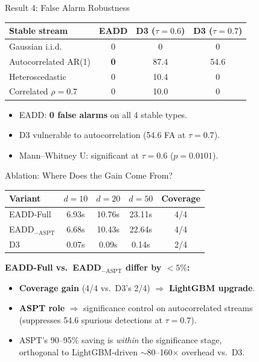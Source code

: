 \documentclass[aspectratio=169,10pt]{beamer}
\begin{document}
\begin{frame}{Result 4: False Alarm Robustness}
\centering\small
\begin{tabular}{lccc}
\toprule
\textbf{Stable stream} & \textbf{EADD} & \textbf{D3 ($\tau{=}0.6$)} & \textbf{D3 ($\tau{=}0.7$)} \\
\midrule
Gaussian i.i.d.       & 0 & 0    & 0    \\
Autocorrelated AR(1)  & \textbf{0} & 87.4 & 54.6 \\
Heteroscedastic       & 0 & 10.4 & 0    \\
Correlated $\rho{=}0.7$ & 0 & 10.0 & 0    \\
\bottomrule
\end{tabular}

\bigskip
\begin{itemize}
\item EADD: \textbf{0 false alarms} on all 4 stable types.
\item D3 vulnerable to autocorrelation (54.6 FA at $\tau{=}0.7$).
\item Mann--Whitney U: significant at $\tau{=}0.6$ ($p{=}0.0101$).
\end{itemize}
\end{frame}

\begin{frame}{Ablation: Where Does the Gain Come From?}
\centering\small
\begin{tabular}{lcccc}
\toprule
\textbf{Variant} & \textbf{$d{=}10$} & \textbf{$d{=}20$} & \textbf{$d{=}50$} & \textbf{Coverage} \\
\midrule
EADD-Full              & 6.93s  & 10.76s & 23.11s & 4/4 \\
EADD$_{-\mathrm{ASPT}}$ & 6.68s  & 10.43s & 22.64s & 4/4 \\
D3                     & 0.07s  & 0.09s  & 0.14s  & 2/4 \\
\bottomrule
\end{tabular}

\medskip
\textbf{EADD-Full vs.\ EADD$_{-\mathrm{ASPT}}$ differ by $<\!5\%$:}
\begin{itemize}
\item \textbf{Coverage gain} (4/4 vs.\ D3's 2/4) $\Rightarrow$ \textbf{LightGBM upgrade}.
\item \textbf{ASPT role} $\Rightarrow$ significance control on autocorrelated streams \\
      (suppresses 54.6 spurious detections at $\tau{=}0.7$).
\item ASPT's 90--95\% saving is \textit{within} the significance stage, \\
      orthogonal to LightGBM-driven $\sim$80--160$\times$ overhead vs.\ D3.
\end{itemize}
\end{frame}
\end{document}
